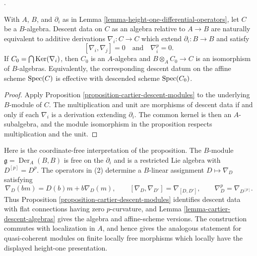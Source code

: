 \begin{lemma}
\label{lemma-cartier-descent-algebras}
\begin{reference}
\cite[Expos\'e 190, n\textsuperscript{o} 3, pp. 321--322]{FGA}.
\end{reference}
With $A$, $B$, and $\partial_i$ as in
Lemma \ref{lemma-height-one-differential-operators}, let $C$ be a $B$-algebra.
Descent data on $C$ as an algebra relative to $A \to B$ are naturally
equivalent to additive derivations $\nabla_i : C \to C$ which extend
$\partial_i : B \to B$ and satisfy
$$
[\nabla_i, \nabla_j] = 0
\quad\text{and}\quad
\nabla_i^p = 0.
$$
If $C_0 = \bigcap \mathop{\mathrm{Ker}}(\nabla_i)$, then $C_0$ is an $A$-algebra and
$B \otimes_A C_0 \to C$ is an isomorphism of $B$-algebras. Equivalently,
the corresponding descent datum on the affine scheme $\mathop{\mathrm{Spec}}(C)$ is effective
with descended scheme $\mathop{\mathrm{Spec}}(C_0)$.
\end{lemma}

\begin{proof}
Apply Proposition \ref{proposition-cartier-descent-modules} to the underlying
$B$-module of $C$. The multiplication and unit are morphisms of descent data
if and only if each $\nabla_i$ is a derivation extending $\partial_i$.
The common kernel is then an $A$-subalgebra, and the module isomorphism in the
proposition respects multiplication and the unit.
\end{proof}

\noindent
Here is the coordinate-free interpretation of the proposition. The
$B$-module $\mathfrak g = \operatorname{Der}_A(B, B)$ is free on the
$\partial_i$ and is a
restricted Lie algebra with $D^{[p]} = D^p$. The operators in (2) determine a
$B$-linear assignment $D \mapsto \nabla_D$ satisfying
$$
\nabla_D(bm) = D(b)m + b\nabla_D(m),
\qquad
[\nabla_D, \nabla_{D'}] = \nabla_{[D,D']},
\qquad
\nabla_D^p = \nabla_{D^{[p]}}.
$$
Thus Proposition \ref{proposition-cartier-descent-modules} identifies descent
data with flat connections having zero $p$-curvature, and
Lemma \ref{lemma-cartier-descent-algebras} gives the algebra and
affine-scheme versions. The construction commutes with localization in $A$,
and hence gives the analogous statement for quasi-coherent modules on finite
locally free morphisms which locally have the displayed height-one
presentation.





